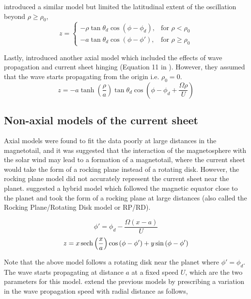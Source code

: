  introduced a similar model but limited the latitudinal extent of the oscillation beyond $\rho \geq \rho_0$,
\begin{equation}
    z = \begin{cases}
    -\rho \tan\theta_d \cos\left(\phi - \phi_d\right), & \text{for } \rho < \rho_0\\
    -a \tan\theta_d \cos\left(\phi - \phi'\right),  & \text{for } \rho \geq \rho_0
    \end{cases}
\end{equation}

Lastly,  introduced another axial model which included the effects of wave propagation and current sheet hinging (Equation 11 in ). However, they assumed that the wave starts propagating from the origin i.e. $\rho_0=0$.
\begin{equation}
    z = -a \tanh\left(\frac{\rho}{a}\right) \tan\theta_d \cos\left(\phi - \phi_d + \frac{\Omega \rho}{U}\right)
    \label{eqn:behannon1981}
\end{equation}

\subsection{Non-axial models of the current sheet}
Axial models were found to fit the data poorly at large distances in the magnetotail, and it was suggested that the interaction of the magnetosphere with the solar wind may lead to a formation of a magnetotail, where the current sheet would take the form of a rocking plane instead of a rotating disk. However, the rocking plane model did not accurately represent the current sheet near the planet.  suggested a hybrid model which followed the magnetic equator close to the planet and took the form of a rocking plane at large distances (also called the Rocking Plane/Rotating Disk model or RP/RD).

\begin{equation}
    \phi' = \phi_d - \frac{\Omega \left(x - a\right)}{U}
\end{equation}
\begin{equation}
    z = x \operatorname{sech} \left( \frac{x}{a} \right) \cos\left(\phi - \phi' \right) + y \sin\left(\phi - \phi' \right)  
\end{equation}

Note that the above model follows a rotating disk near the planet where $\phi'=\phi_d$. The wave starts propagating at distance $a$ at a fixed speed $U$, which are the two parameters for this model.  extend the previous models by prescribing a variation in the wave propagation speed with radial distance as follows,

